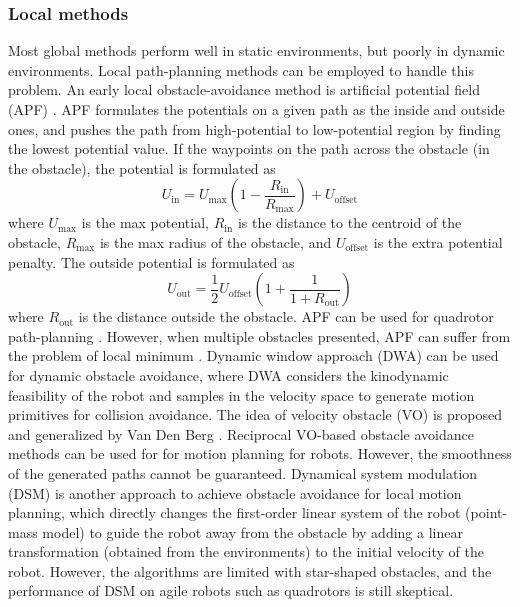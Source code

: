 \documentclass[letterpaper,journal,twoside]{IEEEtran}
\begin{document}
\subsubsection{Local methods}
Most global methods perform well in static environments, 
but poorly in dynamic environments. 
Local path-planning methods can be employed to handle 
this problem. 
An early local obstacle-avoidance method is artificial 
potential field (APF) \cite{warren1989global}.
APF formulates the potentials on a given path as the 
inside and outside ones, and pushes the path from 
high-potential to low-potential region by finding the 
lowest potential value. 
If the waypoints on the path across the 
obstacle (in the obstacle), the potential is formulated as 
\begin{equation}
\label{eq:APF_in}
U_{\text{in}} = 
U_{\text{max}}(1 - \frac{R_{\text{in}}}{R_{\text{max}}}) + 
U_{\text{offset}}
\end{equation}
where $U_{\text{max}}$ is the max potential, 
$R_{\text{in}}$ is the distance to the centroid of the 
obstacle, $R_{\text{max}}$ is the max radius of the 
obstacle, and $U_{\text{offset}}$ is the extra 
potential penalty.
The outside potential is formulated as 
\begin{equation}
\label{eq:APF_out}
U_{\text{out}} = 
\frac{1}{2}U_{\text{offset}}(1+ \frac{1}{1+R_\text{out}})
\end{equation}
where $R_{\text{out}}$ is the distance outside the obstacle.
APF can be used for quadrotor path-planning \cite{chen2016uav}.
However, when multiple obstacles presented, APF can suffer 
from the problem of local minimum \cite{koren1991potential}.
Dynamic window approach (DWA) \cite{seder2007dynamic} can 
be used for dynamic obstacle avoidance, where DWA considers
the kinodynamic feasibility of the robot and samples in the 
velocity space to generate motion primitives for collision 
avoidance. 
The idea of velocity obstacle (VO) is proposed and generalized
by Van Den Berg \cite{van2011reciprocal,van2011reciprocal2,bareiss2013reciprocal}.
Reciprocal VO-based obstacle avoidance methods can be used for
for motion planning for robots.  
However, the smoothness of the generated paths cannot be 
guaranteed. 
Dynamical system modulation (DSM)
\cite{khansari2012dynamical,huber2022fast,huber2023avoidance}
is another approach to achieve obstacle avoidance for local
motion planning, which directly changes the first-order 
linear system of the robot (point-mass model) to guide the 
robot away from the obstacle by adding a linear transformation
(obtained from the environments) to the initial velocity of 
the robot.
However, the algorithms are limited with star-shaped obstacles, 
and the performance of DSM on agile robots such as quadrotors
is still skeptical.
\end{document}
